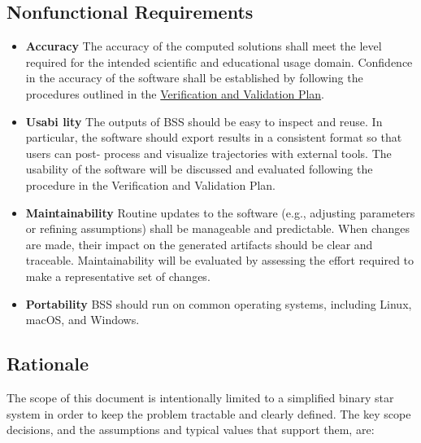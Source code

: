 \documentclass[12pt]{article}
\newcounter{nfrnum} %
\begin{document}
\subsection{Nonfunctional Requirements}


\noindent \begin{itemize}

\item[NFR\refstepcounter{nfrnum}\thenfrnum \label{NFR_Accuracy}:]
  \textbf{Accuracy} The accuracy of the computed solutions shall meet the level required for the
intended scientific and educational usage domain. Confidence in the accuracy of
the software shall be established by following the procedures outlined in the
\hyperref[sec_VnV]{Verification and Validation Plan}.

\item[NFR\refstepcounter{nfrnum}\thenfrnum \label{NFR_Usability}:] \textbf{Usabi
  lity}
The outputs of BSS should be easy to inspect and reuse. In particular, the
software should export results in a consistent format so that users can post-
process and visualize trajectories with external tools. The usability of the
software will be discussed and evaluated following the procedure in the
Verification and Validation Plan.

\item[NFR\refstepcounter{nfrnum}\thenfrnum \label{NFR_Maintainability}:]
  \textbf{Maintainability} Routine updates to the software (e.g., adjusting
parameters or refining assumptions) shall be manageable and predictable. When
changes are made, their impact on the generated artifacts should be clear and
traceable. Maintainability will be evaluated by assessing the effort required to
make a representative set of changes.

\item[NFR\refstepcounter{nfrnum}\thenfrnum \label{NFR_Portability}:]
  \textbf{Portability} BSS should run on common operating systems, including Linux, macOS, and
Windows.

\end{itemize}

\label{sec_VnV}

\subsection{Rationale}

The scope of this document is intentionally limited to a simplified binary star
system in order to keep the problem tractable and clearly defined. The key scope
decisions, and the assumptions and typical values that support them, are:
\end{document}
